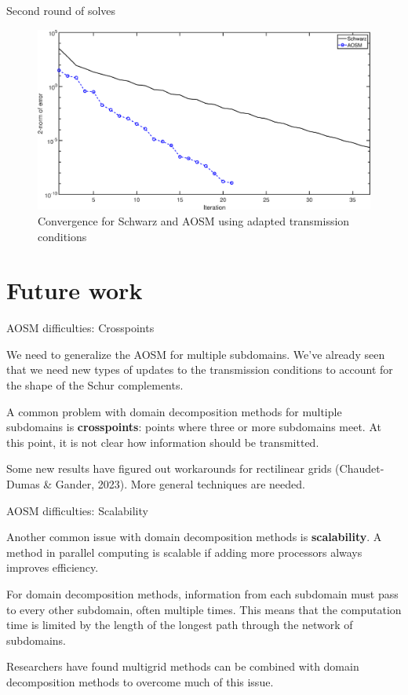 \documentclass{beamer}
\begin{document}
\begin{frame}{Second round of solves}
\begin{figure}
	\centering
	\includegraphics[width=\textwidth]{AOSM/PLOT_LonelandSecond_Seminar.eps}
	\caption{Convergence for Schwarz and AOSM using adapted transmission conditions}
\end{figure}
\end{frame}

\section{Future work}

\begin{frame}{AOSM difficulties: Crosspoints}

We need to generalize the AOSM for multiple subdomains.
We've already seen that we need new types of updates to the transmission conditions to account for the shape of the Schur complements.

A common problem with domain decomposition methods for multiple subdomains is \textbf{crosspoints}: points where three or more subdomains meet.
At this point, it is not clear how information should be transmitted.

Some new results have figured out workarounds for rectilinear grids (Chaudet-Dumas \& Gander, 2023).
More general techniques are needed.
\end{frame}

\begin{frame}{AOSM difficulties: Scalability}

Another common issue with domain decomposition methods is \textbf{scalability}.
A method in parallel computing is scalable if adding more processors always improves efficiency.

For domain decomposition methods, information from each subdomain must pass to every other subdomain, often multiple times.
This means that the computation time is limited by the length of the longest path through the network of subdomains.

Researchers have found multigrid methods can be combined with domain decomposition methods to overcome much of this issue.

\end{frame}
\end{document}
